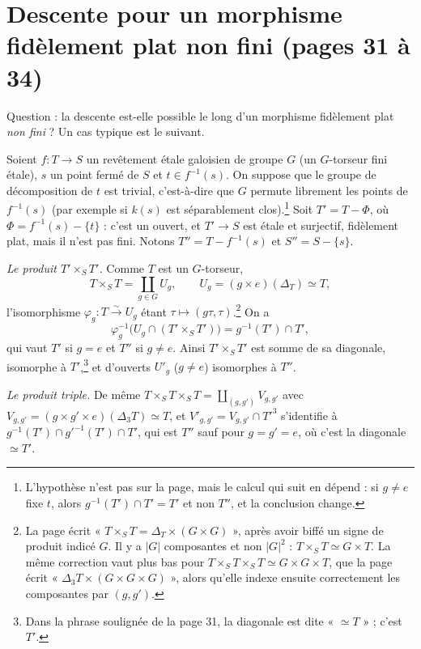 \documentclass[11pt,a4paper]{article}
\begin{document}
\section*{Descente pour un morphisme fidèlement plat non fini (pages 31 à 34)}

Question : la descente est-elle possible le long d'un morphisme fidèlement
plat \emph{non fini} ? Un cas typique est le suivant.

Soient $f : T \to S$ un revêtement étale galoisien de groupe $G$ (un
$G$-torseur fini étale), $s$ un point fermé de $S$ et $t \in f^{-1}(s)$. On
suppose que le groupe de décomposition de $t$ est trivial, c'est-à-dire que
$G$ permute librement les points de $f^{-1}(s)$ (par exemple si $k(s)$ est
séparablement clos).\footnote{L'hypothèse n'est pas sur la page, mais le
calcul qui suit en dépend : si $g \neq e$ fixe $t$, alors $g^{-1}(T') \cap T'
= T'$ et non $T''$, et la conclusion change.} Soit $T' = T - \Phi$, où $\Phi
= f^{-1}(s) - \{t\}$ : c'est un ouvert, et $T' \to S$ est étale et surjectif,
fidèlement plat, mais il n'est pas fini. Notons $T'' = T - f^{-1}(s)$ et
$S'' = S - \{s\}$.

\emph{Le produit $T' \times_S T'$.} Comme $T$ est un $G$-torseur,
\[
  T \times_S T = \coprod_{g \in G} U_g , \qquad U_g = (g \times e)(\Delta_T)
  \simeq T ,
\]
l'isomorphisme $\varphi_g : T \xrightarrow{\sim} U_g$ étant $\tau \mapsto (g\tau,
\tau)$.\footnote{La page écrit « $T \times_S T = \Delta_T \times (G \times G)$ »,
après avoir biffé un signe de produit indicé $G$. Il y a $|G|$ composantes et
non $|G|^2$ : $T \times_S T \simeq G \times T$. La même correction vaut plus
bas pour $T \times_S T \times_S T \simeq G \times G \times T$, que la page écrit
« $\Delta_3 T \times (G \times G \times G)$ », alors qu'elle indexe ensuite
correctement les composantes par $(g, g')$.} On a
\[
  \varphi_g^{-1}\bigl(U_g \cap (T' \times_S T')\bigr) = g^{-1}(T') \cap T' ,
\]
qui vaut $T'$ si $g = e$ et $T''$ si $g \neq e$. Ainsi $T' \times_S T'$ est
somme de sa diagonale, isomorphe à $T'$,\footnote{Dans la phrase soulignée de
la page 31, la diagonale est dite « $\simeq T$ » ; c'est $T'$.} et d'ouverts $U'_g$ ($g \neq e$)
isomorphes à $T''$.

\emph{Le produit triple.} De même $T \times_S T \times_S T = \coprod_{(g, g')}
V_{g,g'}$ avec $V_{g,g'} = (g \times g' \times e)(\Delta_3 T) \simeq T$, et
$V'_{g,g'} = V_{g,g'} \cap T'^{3}$ s'identifie à $g^{-1}(T') \cap g'^{-1}(T')
\cap T'$, qui est $T''$ sauf pour $g = g' = e$, où c'est la diagonale $\simeq
T'$.
\end{document}
